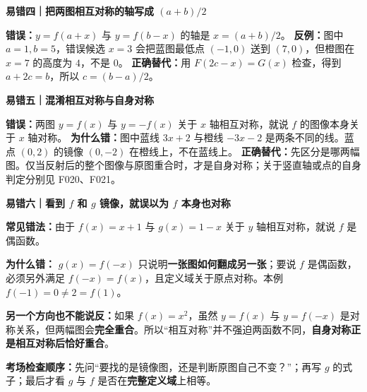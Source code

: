 \clearpage
\begin{trapbox}
\textbf{易错四｜把两图相互对称的轴写成 $(a+b)/2$}


\textbf{错误：}$y=f(a+x)$ 与 $y=f(b-x)$ 的轴是 $x=(a+b)/2$。
\textbf{反例：}图中 $a=1,b=5$，错误候选 $x=3$ 会把蓝图最低点 $(-1,0)$ 送到 $(7,0)$，但橙图在 $x=7$ 的高度为 $4$，不是 $0$。
\textbf{正确替代：}用 $F(2c-x)=G(x)$ 检查，得到 $a+2c=b$，所以 $c=(b-a)/2$。

\end{trapbox}
\clearpage
\begin{trapbox}
\textbf{易错五｜混淆相互对称与自身对称}


\textbf{错误：}两图 $y=f(x)$ 与 $y=-f(x)$ 关于 $x$ 轴相互对称，就说 $f$ 的图像本身关于 $x$ 轴对称。
\textbf{为什么错：}图中蓝线 $3x+2$ 与橙线 $-3x-2$ 是两条不同的线。蓝点 $(0,2)$ 的镜像 $(0,-2)$ 在橙线上，不在蓝线上。
\textbf{正确替代：}先区分是哪两幅图。仅当反射后的整个图像与原图重合时，才是自身对称；关于竖直轴或点的自身判定分别见 F020、F021。

\end{trapbox}


\clearpage
\begin{trapbox}
\textbf{易错六｜看到 $f$ 和 $g$ 镜像，就误以为 $f$ 本身也对称}
\begin{center}
\end{center}
\textbf{常见错法：}由于 $f(x)=x+1$ 与 $g(x)=1-x$ 关于 $y$ 轴相互对称，就说 $f$ 是偶函数。

\textbf{为什么错：} $g(x)=f(-x)$ 只说明\textbf{一张图如何翻成另一张}；要说 $f$ 是偶函数，必须另外满足 $f(-x)=f(x)$，且定义域关于原点对称。本例 $f(-1)=0\ne2=f(1)$。

\textbf{另一个方向也不能说反：}如果 $f(x)=x^2$，虽然 $y=f(x)$ 与 $y=f(-x)$ 是对称关系，但两幅图会\textbf{完全重合}。所以“相互对称”并不强迫两函数不同，\textbf{自身对称正是相互对称后恰好重合}。

\textbf{考场检查顺序：}先问“要找的是镜像图，还是判断原图自己不变？”；再写 $g$ 的式子；最后才看 $g$ 与 $f$ 是否在\textbf{完整定义域}上相等。
\end{trapbox}


